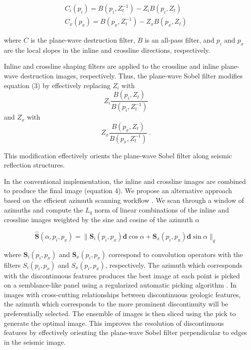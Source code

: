 \begin{equation}
\begin{array}{l}
C_i(p_i)=B(p_i,Z_t^{-1})-Z_iB(p_i,Z_t)\\
C_x(p_x)=B(p_x,Z_t^{-1})-Z_xB(p_x,Z_t)
\end{array}
\end{equation}

where $C$ is the plane-wave destruction filter, $B$ is an all-pass filter, and $p_i$ and $p_x$ are the local slopes in the inline and crossline directions, respectively.

Inline and crossline shaping filters are applied to the crossline and inline plane-wave destruction images, respectively.
Thus, the plane-wave Sobel filter modifies equation (3) by effectively replacing $Z_i$ with
\begin{equation}
Z_i\frac{B(p_i,Z_t)}{B(p_i,Z_t^{-1})}
\end{equation}
and $Z_x$ with
\begin{equation}
Z_x\frac{B(p_x,Z_t)}{B(p_x,Z_t^{-1})} \ .
\end{equation}

This modification effectively orients the plane-wave Sobel filter along seismic reflection structures.

In the conventional implementation, the inline and crossline images are combined to produce the final image (equation 4).
We propose an alternative approach based on the efficient azimuth scanning workflow \cite[]{merzlikin}. 
We scan through a window of azimuths and compute the $L_q$ norm of linear combinations of the inline and crossline images weighted by the sine and cosine of the azimuth $\alpha$ 

\begin{equation}
\hat{\mathbf{S}}(\alpha,p_i,p_x)=\|\mathbf{S}_i(p_i,p_x)\mathbf{d}\cos\alpha+\mathbf{S}_x(p_i,p_x)\mathbf{d}\sin\alpha\|_q
\end{equation}

where $\mathbf{S}_i(p_i,p_x)$ and $\mathbf{S}_x(p_i,p_x)$ correspond to convolution operators with the filters $S_i(p_i,p_x)$ and $S_x(p_i,p_x)$, respectively.
The azimuth which corresponds with the discontinuous features produces the best image at each point is picked on a semblance-like panel using a regularized automatic picking algorithm \cite[]{fomel09}.
In images with cross-cutting relationships between discontinuous geologic features, the azimuth which corresponds to the more prominent discontinuity will be preferentially selected.
The ensemble of images is then sliced using the pick to generate the optimal image.
This improves the resolution of discontinuous features by effectively orienting the plane-wave Sobel filter perpendicular to edges in the seismic image. 

